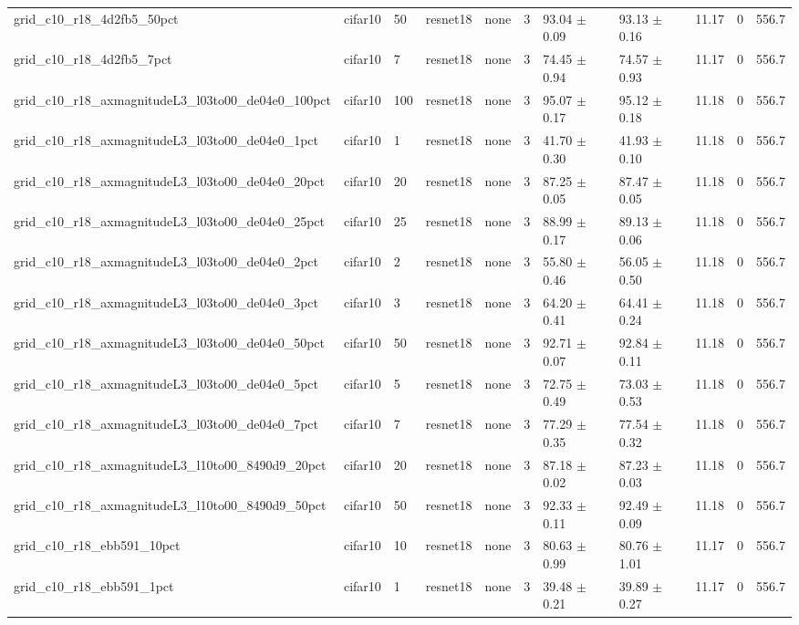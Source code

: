 \begin{tabular}{lllllllllll}
grid_c10_r18_4d2fb5_50pct & cifar10 & 50 & resnet18 & none & 3 & 93.04 $\pm$ 0.09 & 93.13 $\pm$ 0.16 & 11.17 & 0 & 556.7 \\
grid_c10_r18_4d2fb5_7pct & cifar10 & 7 & resnet18 & none & 3 & 74.45 $\pm$ 0.94 & 74.57 $\pm$ 0.93 & 11.17 & 0 & 556.7 \\
grid_c10_r18_axmagnitudeL3_l03to00_de04e0_100pct & cifar10 & 100 & resnet18 & none & 3 & 95.07 $\pm$ 0.17 & 95.12 $\pm$ 0.18 & 11.18 & 0 & 556.7 \\
grid_c10_r18_axmagnitudeL3_l03to00_de04e0_1pct & cifar10 & 1 & resnet18 & none & 3 & 41.70 $\pm$ 0.30 & 41.93 $\pm$ 0.10 & 11.18 & 0 & 556.7 \\
grid_c10_r18_axmagnitudeL3_l03to00_de04e0_20pct & cifar10 & 20 & resnet18 & none & 3 & 87.25 $\pm$ 0.05 & 87.47 $\pm$ 0.05 & 11.18 & 0 & 556.7 \\
grid_c10_r18_axmagnitudeL3_l03to00_de04e0_25pct & cifar10 & 25 & resnet18 & none & 3 & 88.99 $\pm$ 0.17 & 89.13 $\pm$ 0.06 & 11.18 & 0 & 556.7 \\
grid_c10_r18_axmagnitudeL3_l03to00_de04e0_2pct & cifar10 & 2 & resnet18 & none & 3 & 55.80 $\pm$ 0.46 & 56.05 $\pm$ 0.50 & 11.18 & 0 & 556.7 \\
grid_c10_r18_axmagnitudeL3_l03to00_de04e0_3pct & cifar10 & 3 & resnet18 & none & 3 & 64.20 $\pm$ 0.41 & 64.41 $\pm$ 0.24 & 11.18 & 0 & 556.7 \\
grid_c10_r18_axmagnitudeL3_l03to00_de04e0_50pct & cifar10 & 50 & resnet18 & none & 3 & 92.71 $\pm$ 0.07 & 92.84 $\pm$ 0.11 & 11.18 & 0 & 556.7 \\
grid_c10_r18_axmagnitudeL3_l03to00_de04e0_5pct & cifar10 & 5 & resnet18 & none & 3 & 72.75 $\pm$ 0.49 & 73.03 $\pm$ 0.53 & 11.18 & 0 & 556.7 \\
grid_c10_r18_axmagnitudeL3_l03to00_de04e0_7pct & cifar10 & 7 & resnet18 & none & 3 & 77.29 $\pm$ 0.35 & 77.54 $\pm$ 0.32 & 11.18 & 0 & 556.7 \\
grid_c10_r18_axmagnitudeL3_l10to00_8490d9_20pct & cifar10 & 20 & resnet18 & none & 3 & 87.18 $\pm$ 0.02 & 87.23 $\pm$ 0.03 & 11.18 & 0 & 556.7 \\
grid_c10_r18_axmagnitudeL3_l10to00_8490d9_50pct & cifar10 & 50 & resnet18 & none & 3 & 92.33 $\pm$ 0.11 & 92.49 $\pm$ 0.09 & 11.18 & 0 & 556.7 \\
grid_c10_r18_ebb591_10pct & cifar10 & 10 & resnet18 & none & 3 & 80.63 $\pm$ 0.99 & 80.76 $\pm$ 1.01 & 11.17 & 0 & 556.7 \\
grid_c10_r18_ebb591_1pct & cifar10 & 1 & resnet18 & none & 3 & 39.48 $\pm$ 0.21 & 39.89 $\pm$ 0.27 & 11.17 & 0 & 556.7 \\

\end{tabular}
